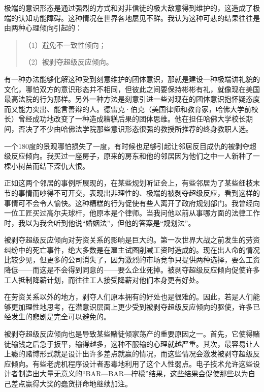 极端的意识形态是通过强烈的方式和对非信徒的极大敌意得到维护的，这造成了极端的认知功能障碍。这种情况在世界各地屡见不鲜。我认为这种可悲的结果往往是由两种心理倾向引起的：
\par

\begin{quotation}
（1）避免不一致性倾向；
\par

（2）被剥夺超级反应倾向。
\par
\end{quotation}

有一种办法能够化解这种受到刻意维护的团体意识，那就是建设一种极端讲礼貌的文化，哪怕双方的意识形态并不相同，但彼此之间要保持彬彬有礼，就像现在美国最高法院的行为那样。另外一种方法是刻意引进一些对现在的团体意识抱怀疑态度而又能力突出、能言善辩的人。德雷克·伯克（美国律师和教育家，哈佛大学前校长）曾经成功地改变了一种造成糟糕后果的团体思维。他在担任哈佛大学校长期间，否决了不少由哈佛法学院那些意识形态很强的教授所推荐的终身教职人选。
\par

一个180度的景观哪怕损失了一度，有时候也足够引起让邻居反目成仇的被剥夺超级反应倾向。我买过一座房子，原来的房东和他的邻居因为他们之中一人新种了一棵小树苗而结下深仇大恨。
\par

正如这两个邻居的事例所展现的，在某些规划听证会上，有些邻居为了某些细枝末节的事情而吵得不可开交，表现出非理性的、极端的被剥夺超级反应，看到这样的事情可不会令人愉快。这种糟糕的行为促使有些人离开了政府规划部门。我曾经向一位工匠买过高尔夫球杆，他原本是个律师。当我问他以前从事哪方面的法律工作时，我以为我会听到他说“婚姻法”，但他的答案是“规划法”。
\par

被剥夺超级反应倾向对劳资关系的影响是巨大的。第一次世界大战之前发生的劳资纠纷中的死亡事件，绝大多数是在雇主试图削减工资时造成的。现在出人命的情况比较少见，但更多的公司消失了，因为激烈的市场竞争只提供两种选择，要么工资降低——而这是不会得到同意的——要么企业死掉。被剥夺超级反应倾向促使许多工人抵制降薪计划，而往往工人接受降薪对他们本身更有好处。
\par

在劳资关系以外的地方，剥夺人们原本拥有的好处也是很难的。因此，若是人们能够更加理性地思考，在潜意识层面上更少受到被剥夺超级反应倾向的驱使，许多已经发生的悲剧是完全可以避免的。
\par

被剥夺超级反应倾向也是导致某些赌徒倾家荡产的重要原因之一。首先，它使得赌徒输钱之后急于扳平，输得越多，这种不服输的心理就越严重。其次，最容易让人上瘾的赌博形式就是设计出许多差点就赢的情况，而这些情况会激发被剥夺超级反应倾向。有些老虎机程序设计者恶毒地利用了这个人性弱点。电子技术允许这些设计者制造出大量无意义的“BAR—BAR—柠檬”结果，这些结果会促使那些以为自己差点赢得大奖的蠢货拼命地继续加注。
\par

